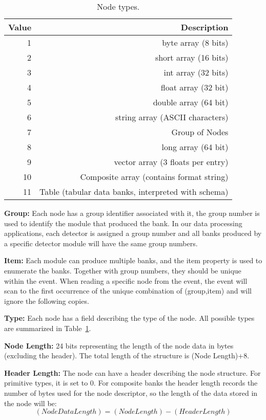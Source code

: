 \documentclass[preprint,12pt]{elsarticle}
\begin{document}
\begin{table}[h!]
\begin{center}

\begin{tabular}{r|r}
Value & Description \\
\hline
\hline
1 & byte array  (8 bits) \\
2 & short array (16 bits) \\
3 & int array (32 bits) \\
4 & float array (32 bit) \\
5 & double array (64 bit) \\
6 & string array (ASCII characters) \\
7 & Group of Nodes \\
8 & long array (64 bit) \\
9 & vector array (3 floats per entry) \\
10 & Composite array (contains format string) \\
11 & Table (tabular data banks, interpreted with schema)
\end{tabular}

\end{center}
\caption{Node types.}
\label{data:types}
\end{table}


{\bf Group:} Each node has a group identifier associated with it, the group number is used to identify the module that produced 
the bank. In our data processing applications, each detector is assigned a group number and all banks produced by a specific 
detector module will have the same group numbers.

{\bf Item:} Each module can produce multiple banks, and the item property is used to enumerate the banks. Together with group numbers,
they should be unique within the event. When reading a specific node from the event, the event will scan to the first occurrence of the unique combination 
of (group,item) and will ignore the following copies.

{\bf Type:} Each node has a field describing the type of the node. All possible types are summarized in Table~\ref{data:types}.

{\bf Node Length:} 24 bits representing the length of the node data in bytes (excluding the header). The total length of the structure is 
(Node Length)+8.

{\bf Header Length:} The node can have a header describing the node structure. For primitive types, it is set to 0. For composite banks
the header length records the number of bytes used for the node descriptor, so the length of the data stored in the node will be:
\begin{equation}
(Node Data Length) = (Node Length) - (Header Length)
\end{equation}
 
\end{document}
